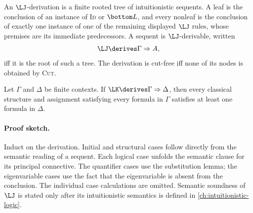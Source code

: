 \begin{definition}[\(\LJ\)-derivation]
An \(\LJ\)-derivation is a finite rooted tree of intuitionistic sequents.  A
leaf is the conclusion of an instance of \textsc{Id} or
\textsc{\(\bottom L\)}, and every nonleaf is the conclusion of exactly one
instance of one of the remaining displayed \(\LJ\) rules, whose premises are
its immediate predecessors.  A sequent is \(\LJ\)-derivable, written
\[
  \LJ\derives\Gamma\Rightarrow A,
\]
iff it is the root of such a tree.  The derivation is cut-free iff
none of its nodes is obtained by \textsc{Cut}.
\end{definition}

\begin{theorem}[Soundness of \(\LK\)]
Let \(\Gamma\) and \(\Delta\) be finite contexts.
If \(\LK\derives\Gamma\Rightarrow\Delta\), then every classical structure
and assignment satisfying every formula in \(\Gamma\) satisfies at least one
formula in \(\Delta\).
\end{theorem}

\paragraph{Proof sketch.}
Induct on the derivation.  Initial and structural cases follow directly from
the semantic reading of a sequent.  Each logical case unfolds the semantic
clause for its principal connective.  The quantifier cases use the substitution
lemma; the eigenvariable cases use the fact that the eigenvariable is absent
from the conclusion.  The individual case calculations are omitted.  Semantic
soundness of \(\LJ\) is stated only after its
intuitionistic semantics is defined in \cref{ch:intuitionistic-logic}.

